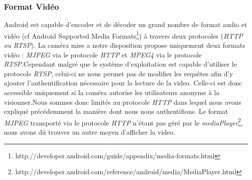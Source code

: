 \subsubsection{Format Vidéo}
Android est capable d'encoder et de décoder un grand nombre de format audio et
vidéo (cf Android Supported Media Formats\footnote{\label{mediaFormat}
http://developer.android.com/guide/appendix/media-formats.html}) à travers
deux protocoles (\textit{HTTP ou RTSP}).\newline
La caméra mise a notre disposition propose uniquement deux formats vidéo :
\textit{MJPEG} via le protocole \textit{HTTP} et \textit{MPEG4} via le protocole
\textit{RTSP}.\newline Cependant malgré que le système d'exploitation est
capable d'utiliser le protocole \textit{RTSP}, celui-ci ne nous permet pas de
modifier les requêtes afin d'y ajouter l'authentification nécessaire pour la
lecture de la video. Celle-ci est donc accessible uniquement si la caméra
autorise les utilisateurs anonyme à la visionner.\newline Nous sommes donc
limités au protocole \textit{HTTP} dans lequel nous avons expliqué précédemment
la manière dont nous nous authentifions.\newline\newline
Le format \textit{MJPEG} transporté via le protocole \textit{HTTP} n'étant pas géré par le
\textit{mediaPlayer}\footnote{\label{mediaPlayer}
http://developer.android.com/reference/android/media/MediaPlayer.html}, nous
avons dû trouver un autre moyen d'afficher la video.
